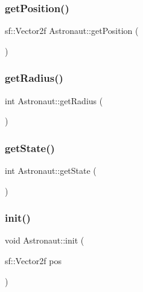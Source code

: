 \subsubsection{\texorpdfstring{get\+Position()}{getPosition()}}
{\footnotesize\ttfamily sf\+::\+Vector2f Astronaut\+::get\+Position (\begin{DoxyParamCaption}{ }\end{DoxyParamCaption})}

\mbox{\label{class_astronaut_afcf013c7b009a8ef65ab84613eba4000}} 
\subsubsection{\texorpdfstring{get\+Radius()}{getRadius()}}
{\footnotesize\ttfamily int Astronaut\+::get\+Radius (\begin{DoxyParamCaption}{ }\end{DoxyParamCaption})}

\mbox{\label{class_astronaut_a6396ab5b07039062ab97666d36bb781a}} 
\subsubsection{\texorpdfstring{get\+State()}{getState()}}
{\footnotesize\ttfamily int Astronaut\+::get\+State (\begin{DoxyParamCaption}{ }\end{DoxyParamCaption})}

\mbox{\label{class_astronaut_a1f21de93b38b191d9641b8b23bcbbacb}} 
\subsubsection{\texorpdfstring{init()}{init()}}
{\footnotesize\ttfamily void Astronaut\+::init (\begin{DoxyParamCaption}\item[{sf\+::\+Vector2f}]{pos }\end{DoxyParamCaption})}

\mbox{\label{class_astronaut_aeba104cdac7b5d4bf3be18b890dd0b25}} 
